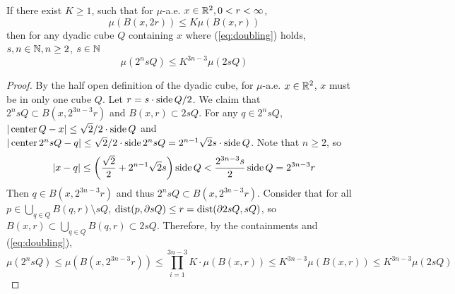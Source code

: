 \begin{lemma}\label{lemma:doubling-meaure-4cubes}
    If there exist $K\geq1$, such that for $\mu$-a.e. $x\in \mathbb{R}^2, 0<r<\infty$, 
    \begin{equation}\label{eq:doubling}
        \mu(B(x, 2r))\leq K\mu(B(x,r))
    \end{equation} 
    then for any dyadic cube $Q$ containing $x$ where (\ref{eq:doubling}) holds, {\color{red}$s, n\in \mathbb{N}, n\geq 2$, $s\in \mathbb{N}$
    \begin{equation}\label{eq:doubling4cubes}
        \mu(2^n sQ)\leq K^{3n-3} \mu(2sQ)
    \end{equation}}
\end{lemma}
\begin{proof}
    By the half open definition of the dyadic cube, for $\mu$-a.e. $x\in \mathbb{R}^2$, $x$ must be in only one cube $Q$. Let {\color{red}$r = s\cdot \operatorname{side} Q /2$. We claim that $2^n sQ\subset B(x, 2^{3n-3}r)$ and $B(x, r)\subset 2sQ$. For any $q\in 2^n sQ$, $|\operatorname{center} Q -x|\leq \sqrt{2}/2\cdot\operatorname{side} Q $ and $|\operatorname{center} 2^n sQ -q|\leq \sqrt{2}/2 \cdot\operatorname{side} 2^n sQ  = 2^{n-1}\sqrt{2}s\cdot \operatorname{side} Q$. Note that $n\geq 2$, so
    \begin{equation*}
        |x-q| \leq \left(\frac{\sqrt{2}}{2} + 2^{n-1}\sqrt{2}s \right) \operatorname{side} Q < \frac{2^{3n-3} s}{2} \operatorname{side} Q = 2^{3n-3}r
    \end{equation*}
Then $q\in B(x, 2^{3n-3}r)$ and thus $2^n sQ\subset B(x, 2^{3n-3}r)$. Consider that for all $p\in \bigcup_{q\in Q} B(q, r)\setminus sQ$, $\operatorname{dist}(p, \partial sQ)\leq r = \operatorname{dist}(\partial 2sQ, sQ)$, so $B(x, r)\subset \bigcup_{q\in Q} B(q, r)\subset 2sQ$. Therefore, by the containments and (\ref{eq:doubling}), 
    \begin{equation*}
        \mu(2^n sQ) \leq \mu(B(x, 2^{3n-3}r)) \leq \prod_{i=1}^{3n-3} K \cdot \mu(B(x,r))\leq K^{3n-3}\mu(B(x,r))\leq K^{3n-3}\mu(2sQ)
    \end{equation*}
    }
\end{proof}
    

